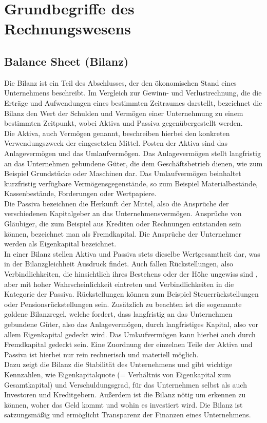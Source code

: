 \section{Grundbegriffe des Rechnungswesens}

\subsection{Balance Sheet (Bilanz)}
Die Bilanz ist ein Teil des Abschlusses, der den ökonomischen Stand eines Unternehmens beschreibt. Im Vergleich zur Gewinn- und Verlustrechnung, die die Erträge und Aufwendungen eines bestimmten Zeitraumes darstellt, bezeichnet die Bilanz den Wert der Schulden und Vermögen einer Unternehmung zu einem bestimmten Zeitpunkt, wobei Aktiva und Passiva gegenübergestellt werden.\cite{businesson}
\\
Die Aktiva, auch Vermögen genannt, beschreiben hierbei den konkreten Verwendungszweck der eingesetzten Mittel. Posten der Aktiva sind das Anlagevermögen und das Umlaufvermögen. Das Anlagevermögen stellt langfristig an das Unternehmen gebundene Güter, die dem Geschäftsbetrieb dienen, wie zum Beispiel Grundstücke oder Maschinen dar. Das Umlaufvermögen beinhaltet kurzfristig verfügbare Vermögensgegenstände, so zum Beispiel Materialbestände, Kassenbestände, Forderungen oder Wertpapiere.
\\
Die Passiva bezeichnen die Herkunft der Mittel, also die Ansprüche der verschiedenen Kapitalgeber an das Unternehmensvermögen. Ansprüche von Gläubiger, die zum Beispiel aus Krediten oder Rechnungen entstanden sein können, bezeichnet man als Fremdkapital. Die Ansprüche der Unternehmer werden als Eigenkapital bezeichnet.\cite{bilanz}
\\
In einer Bilanz stellen Aktiva und Passiva stets dieselbe Wertgesamtheit dar, was in der Bilanzgleichheit Ausdruck findet. Auch fallen Rückstellungen, also Verbindlichkeiten, die hinsichtlich ihres Bestehens oder der Höhe ungewiss sind \cite{rueckstellung}, aber mit hoher Wahrscheinlichkeit eintreten und Verbindlichkeiten in die Kategorie der Passiva. Rückstellungen können zum Beispiel Steuerrückstellungen oder Pensionsrückstellungen sein. Zusätzlich zu beachten ist die sogenannte goldene Bilanzregel, welche fordert, dass langfristig an das Unternehmen gebundene Güter, also das Anlagevermögen, durch langfristiges Kapital, also vor allem Eigenkapital gedeckt wird. Das Umlaufvermögen kann hierbei auch durch Fremdkapital gedeckt sein. Eine Zuordnung der einzelnen Teile der Aktiva und Passiva ist hierbei nur rein rechnerisch und materiell möglich.\cite{bilanzregel}
\\
Dazu zeigt die Bilanz die Stabilität des Unternehmens und gibt wichtige Kennzahlen, wie Eigenkapitalquote (= Verhältnis von Eigenkapital zum Gesamtkapital) und Verschuldungsgrad, für das Unternehmen selbst als auch Investoren und Kreditgebern.\cite{businesson} Außerdem ist die Bilanz nötig um erkennen zu können, woher das Geld kommt und wohin es investiert wird. Die Bilanz ist satzungsmäßig und ermöglicht Transparenz der Finanzen eines Unternehmens.

